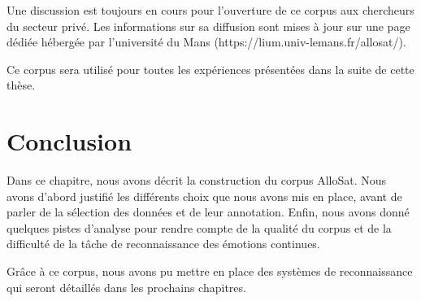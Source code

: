 Une discussion est toujours en cours pour l'ouverture de ce corpus aux chercheurs du secteur privé. Les informations sur sa diffusion sont mises à jour sur une page dédiée hébergée par l'université du Mans (https://lium.univ-lemans.fr/allosat/).

Ce corpus sera utilisé pour toutes les expériences présentées dans la suite de cette thèse.

\section{Conclusion}
Dans ce chapitre, nous avons décrit la construction du corpus AlloSat. Nous avons d'abord justifié les différents choix que nous avons mis en place, avant de parler de la sélection des données et de leur annotation. Enfin, nous avons donné quelques pistes d'analyse pour rendre compte de la qualité du corpus et de la difficulté de la tâche de reconnaissance des émotions continues.

Grâce à ce corpus, nous avons pu mettre en place des systèmes de reconnaissance qui seront détaillés dans les prochains chapitres.
